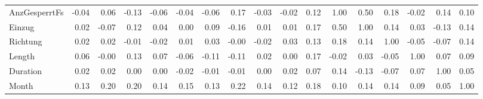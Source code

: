 \begin{tabular}{lrrrrrrrrrrrrrrrr}
AnzGesperrtFs &    -0.04 &     0.06 &    -0.13 &    -0.06 &     -0.04 &     -0.06 &      0.17 &  -0.03 &  -0.02 &     0.12 &           1.00 &    0.50 &      0.18 &   -0.02 &      0.14 &   0.10 \\
Einzug        &     0.02 &    -0.07 &     0.12 &     0.04 &      0.00 &      0.09 &     -0.16 &   0.01 &   0.01 &     0.17 &           0.50 &    1.00 &      0.14 &    0.03 &     -0.13 &   0.14 \\
Richtung      &     0.02 &     0.02 &    -0.01 &    -0.02 &      0.01 &      0.03 &     -0.00 &  -0.02 &   0.03 &     0.13 &           0.18 &    0.14 &      1.00 &   -0.05 &     -0.07 &   0.14 \\
Length        &     0.06 &    -0.00 &     0.13 &     0.07 &     -0.06 &     -0.11 &     -0.11 &   0.02 &   0.00 &     0.17 &          -0.02 &    0.03 &     -0.05 &    1.00 &      0.07 &   0.09 \\
Duration      &     0.02 &     0.02 &     0.00 &     0.00 &     -0.02 &     -0.01 &     -0.01 &   0.00 &   0.02 &     0.07 &           0.14 &   -0.13 &     -0.07 &    0.07 &      1.00 &   0.05 \\
Month         &     0.13 &     0.20 &     0.20 &     0.14 &      0.15 &      0.13 &      0.22 &   0.14 &   0.12 &     0.18 &           0.10 &    0.14 &      0.14 &    0.09 &      0.05 &   1.00 \\
\bottomrule
\end{tabular}
